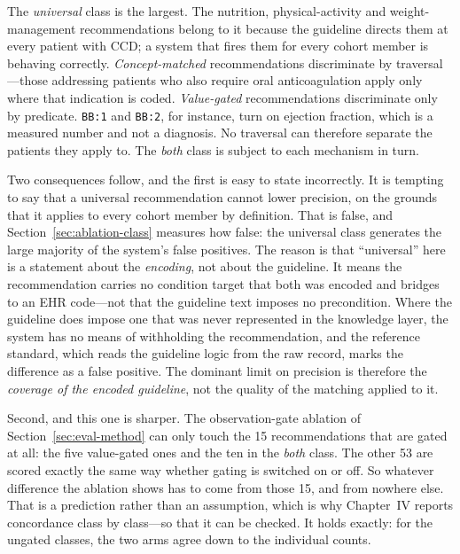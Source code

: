 The \emph{universal} class is the largest. The nutrition, physical-activity and
weight-management recommendations belong to it because the guideline directs them at every
patient with CCD; a system that fires them for every cohort member is behaving correctly.
\emph{Concept-matched} recommendations discriminate by traversal---those addressing patients
who also require oral anticoagulation apply only where that indication is coded.
\emph{Value-gated} recommendations discriminate only by predicate. \texttt{BB:1} and
\texttt{BB:2}, for instance, turn on ejection fraction, which is a measured number and not a
diagnosis. No traversal can therefore separate the patients they apply to. The \emph{both} class is subject to
each mechanism in turn.

Two consequences follow, and the first is easy to state incorrectly. It is tempting to say
that a universal recommendation cannot lower precision, on the grounds that it applies to
every cohort member by definition. That is false, and Section~\ref{sec:ablation-class}
measures how false: the universal class generates the large majority of the system's false
positives. The reason is that ``universal'' here is a statement about the \emph{encoding},
not about the guideline. It means the recommendation carries no condition target that both
was encoded and bridges to an EHR code---not that the guideline text imposes no
precondition. Where the guideline does impose one that was never represented in the
knowledge layer, the system has no means of withholding the recommendation, and the
reference standard, which reads the guideline logic from the raw record, marks the
difference as a false positive. The dominant limit on precision is therefore the
\emph{coverage of the encoded guideline}, not the quality of the matching applied to it.

Second, and this one is sharper. The observation-gate ablation of
Section~\ref{sec:eval-method} can only touch the 15 recommendations that are gated at all:
the five value-gated ones and the ten in the \emph{both} class. The other 53 are scored
exactly the same way whether gating is switched on or off. So whatever difference the ablation
shows has to come from those 15, and from nowhere else. That is a prediction rather than an
assumption, which is why Chapter~IV reports concordance class by class---so that it can be
checked. It holds exactly: for the ungated classes, the two arms agree down to the individual
counts.


